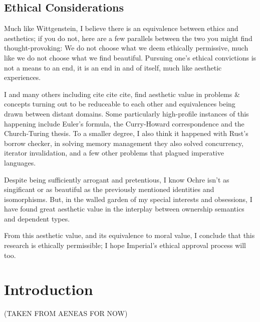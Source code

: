 \documentclass[12pt,twoside]{report}
\begin{document}
\newpage
\section*{Ethical Considerations}
Much like Wittgenstein, I believe there is an equivalence between ethics and aesthetics; if you do not, here are a few parallels between the two you might find thought-provoking: We do not choose what we deem ethically permissive, much like we do not choose what we find beautiful. Pursuing one's ethical convictions is not a means to an end, it is an end in and of itself, much like aesthetic experiences.

I and many others including cite cite cite, find aesthetic value in problems \& concepts turning out to be reduceable to each other and equivalences being drawn between distant domains. Some particularly high-profile instances of this happening include Euler's formula, the Curry-Howard correspondence and the Church-Turing thesis. To a smaller degree, I also think it happened with Rust's borrow checker, in solving memory management they also solved concurrency, iterator invalidation, and a few other problems that plagued imperative languages.

Despite being sufficiently arrogant and pretentious, I know Ochre isn't as singificant or as beautiful as the previously mentioned identities and isomorphisms. But, in the walled garden of my special interests and obsessions, I have found great aesthetic value in the interplay between ownership semantics and dependent types.

From this aesthetic value, and its equivalence to moral value, I conclude that this research is ethically permissible; I hope Imperial's ethical approval process will too.

\clearpage{\pagestyle{empty}\cleardoublepage}

{\small
\begingroup
\setlength{\parskip}{0pt} %
\setlength{\parindent}{0pt} %
\renewcommand{\baselinestretch}{0.9} %
\tableofcontents
\endgroup
}


\setcounter{page}{1}
\fancyhead[LE,RO]{\slshape \rightmark}
\fancyhead[LO,RE]{\slshape \leftmark}

\chapter{Introduction}
(TAKEN FROM AENEAS FOR NOW)
\end{document}
